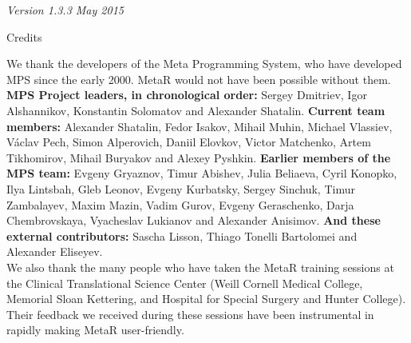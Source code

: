 \documentclass[11pt,fleqn]{book} %
\begin{document}
\noindent \textit{Version 1.3.3 May 2015}

{\newpage\thispagestyle{empty}\hbox{}}

\newpage\thispagestyle{empty}
\begin{empty}
\begin{center}\Large{Credits}\end{center}
\normalsize 
\hspace*{1cm} We thank the developers of the Meta Programming System, who have developed MPS since the early 2000. MetaR would not have been possible without them. \\
\noindent\textbf{MPS Project leaders, in chronological order:}  Sergey Dmitriev,  Igor Alshannikov, Konstantin Solomatov and Alexander Shatalin. \textbf{Current team members:} Alexander Shatalin, Fedor Isakov, Mihail Muhin, Michael Vlassiev, Václav Pech, Simon Alperovich, Daniil Elovkov, Victor Matchenko, Artem Tikhomirov, Mihail Buryakov and Alexey Pyshkin. \textbf{Earlier members of the MPS team:} Evgeny Gryaznov, Timur Abishev, Julia Beliaeva, Cyril Konopko, Ilya Lintsbah, Gleb Leonov, Evgeny Kurbatsky, Sergey Sinchuk, Timur Zambalayev, Maxim Mazin, Vadim Gurov, Evgeny Geraschenko, Darja Chembrovskaya, Vyacheslav Lukianov and Alexander Anisimov. \textbf{And these external contributors:}  Sascha Lisson, Thiago Tonelli Bartolomei and Alexander Eliseyev.\\ 

We also thank the many people who have taken the MetaR training sessions at the Clinical Translational Science Center (Weill Cornell Medical College, Memorial Sloan Kettering, and Hospital for Special Surgery and Hunter College). Their feedback we received during these sessions have been instrumental in rapidly making MetaR user-friendly.\\

\end{empty}

{\newpage\thispagestyle{empty}\hbox{}}

\end{document}
